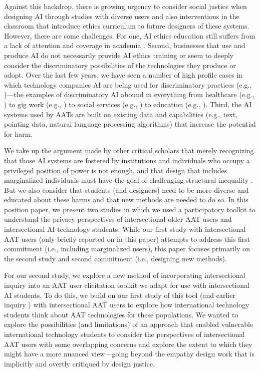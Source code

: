 \documentclass[11pt,dvipdfm]{article}
\begin{document}
Against this backdrop, there is growing urgency to consider social justice when designing AI through studies with diverse users and also interventions in the classroom that introduce ethics curriculum to future designers of these systems. However, there are some challenges. For one, AI ethics education still suffers from a lack of attention and coverage in academia \cite{48}. Second, businesses that use and produce AI do not necessarily provide AI ethics training or seem to deeply consider the discriminatory possibilities of the technologies they produce or adopt. Over the last few years, we have seen a number of high profile cases in which technology companies AI are being used for discriminatory practices (e.g., \cite{27})---the examples of discriminatory AI abound in everything from healthcare (e.g., \cite{4,51}) to gig work (e.g., \cite{33}) to social services (e.g., \cite{18}) to education (e.g., \cite{29,32}). Third, the AI systems used by AATs are built on existing data and capabilities (e.g., text, pointing data, natural language processing algorithms) that increase the potential for harm. 

We take up the argument made by other critical scholars that merely recognizing that those AI systems are fostered by institutions and individuals who occupy a privileged position of power is not enough, and that design that includes marginalized individuals must have the goal of challenging structural inequality \cite{9,10}. But we also consider that students (and designers) need to be more diverse and educated about these harms and that new methods are needed to do so. In this position paper, we present two studies in which we used a participatory toolkit to understand the privacy perspectives of intersectional older AAT users and intersectional AI technology students. While our first study with intersectional AAT users \cite{24} (only briefly reported on in this paper) attempts to address this first commitment (i.e., including marginalized users), this paper focuses primarily on the second study and second commitment (i.e., designing new methods). 

For our second study, we explore a new method of incorporating intersectional inquiry into an AAT user elicitation toolkit we adapt for use with intersectional AI students. To do this, we build on our first study \cite{24} of this tool (and earlier inquiry \cite{25}) with intersectional AAT users to explore how international technology students think about AAT technologies for these populations. We wanted to explore the possibilities (and limitations) of an approach that enabled vulnerable international technology students to consider the perspectives of intersectional AAT users with some overlapping concerns and explore the extent to which they might have a more nuanced view—going beyond the empathy design work that is implicitly and overtly critiqued by design justice.
\end{document}
